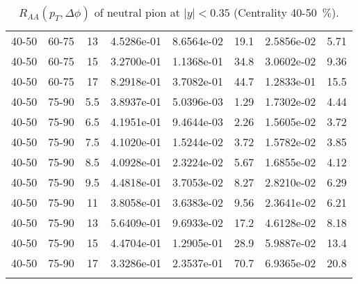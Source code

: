 \begin{longtable}{|cccccccc|}
40-50 & 60-75 & 13 & 4.5286e-01 & 8.6564e-02 & 19.1 & 2.5856e-02 & 5.71 \\ 
40-50 & 60-75 & 15 & 3.2700e-01 & 1.1368e-01 & 34.8 & 3.0602e-02 & 9.36 \\ 
40-50 & 60-75 & 17 & 8.2918e-01 & 3.7082e-01 & 44.7 & 1.2833e-01 & 15.5 \\ 
\hline
40-50 & 75-90 & 5.5 & 3.8937e-01 & 5.0396e-03 & 1.29 & 1.7302e-02 & 4.44 \\ 
40-50 & 75-90 & 6.5 & 4.1951e-01 & 9.4644e-03 & 2.26 & 1.5605e-02 & 3.72 \\ 
40-50 & 75-90 & 7.5 & 4.1020e-01 & 1.5244e-02 & 3.72 & 1.5782e-02 & 3.85 \\ 
40-50 & 75-90 & 8.5 & 4.0928e-01 & 2.3224e-02 & 5.67 & 1.6855e-02 & 4.12 \\ 
40-50 & 75-90 & 9.5 & 4.4818e-01 & 3.7053e-02 & 8.27 & 2.8210e-02 & 6.29 \\ 
40-50 & 75-90 & 11 & 3.8058e-01 & 3.6383e-02 & 9.56 & 2.3641e-02 & 6.21 \\ 
40-50 & 75-90 & 13 & 5.6409e-01 & 9.6933e-02 & 17.2 & 4.6128e-02 & 8.18 \\ 
40-50 & 75-90 & 15 & 4.4704e-01 & 1.2905e-01 & 28.9 & 5.9887e-02 & 13.4 \\ 
40-50 & 75-90 & 17 & 3.3286e-01 & 2.3537e-01 & 70.7 & 6.9365e-02 & 20.8 \\ 
\hline
\caption{$R_{AA}(p_{T},\Delta\phi)$ of neutral pion at $|y|<0.35$ (Centrality 40-50~$\%$).}
\end{longtable}
            
